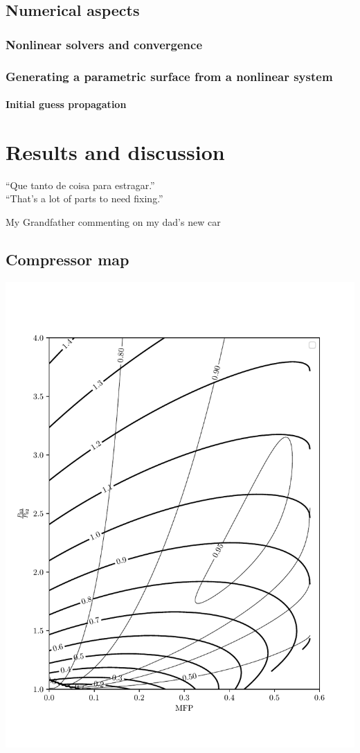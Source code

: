 \documentclass[tcc]{subfiles}
\begin{document}
\section{Numerical aspects}
\subsection{Nonlinear solvers and convergence}
\subsection{Generating a parametric surface from a nonlinear system}
\subsubsection{Initial guess propagation}

\chapter{Results and discussion}
\epigraph{``Que tanto de coisa para estragar.''\\{\footnotesize ``That's a lot of parts to need fixing.}''}{My Grandfather commenting on my dad's new car}
\section{Compressor map}
\includegraphics{src/mapv1.pdf}
\end{document}
